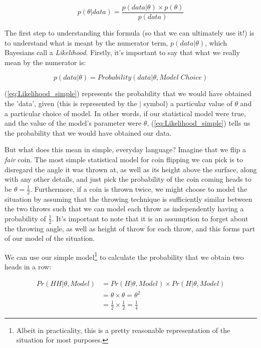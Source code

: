 \documentclass[11pt,fullpage]{book}
\begin{document}
\begin{equation}
p(\theta|data) = \frac{p(data|\theta)\times p(\theta)}{p(data)}
\end{equation}\label{eq:Likelihood_Bayes}

The first step to understanding this formula (so that we can ultimately use it!) is to understand what is meant by the numerator term, $p(data|\theta)$, which Bayesians call a \textit{Likelihood}. Firstly, it's important to say that what we really mean by the numerator is:

\begin{equation}
p(data|\theta) = Probability(data|\theta,Model \; Choice)
\end{equation}\label{eq:Likelihood_simple}

(\ref{eq:Likelihood_simple}) represents the probability that we would have obtained the 'data', given (this is represented by the $|$ symbol) a particular value of $\theta$ and a particular choice of model. In other words, if our statistical model were true, and the value of the model's parameter were $\theta$, (\ref{eq:Likelihood_simple}) tells us the probability that we would have obtained our data. 

But what does this mean in simple, everyday language? Imagine that we flip a \textit{fair} coin. The most simple statistical model for coin flipping we can pick is to disregard the angle it was thrown at, as well as its height above the surface, along with any other details, and just pick the probability of the coin coming heads to be $\theta=\frac{1}{2}$. Furthermore, if a coin is thrown twice, we might choose to model the situation by assuming that the throwing technique is sufficiently similar between the two throws such that we can model each throw as independently having a probability of $\frac{1}{2}$. It's important to note that it is an assumption to forget about the throwing angle, as well as height of throw for each throw, and this forms part of our model of the situation. 

We can use our simple model\footnote{Albeit in practicality, this is a pretty reasonable representation of the situation for most purposes.} to calculate the probability that we obtain two heads in a row:

\begin{equation}
\begin{align}
Pr(HH|\theta,Model) &= Pr(H|\theta,Model)\times Pr(H|\theta,Model)\\
&= \theta \times \theta = \theta^2\\ 
&= \frac{1}{2}\times \frac{1}{2} = \frac{1}{4}
\end{align}
\end{equation}\label{eq:Likelihood_fairCoin}
\end{document}
